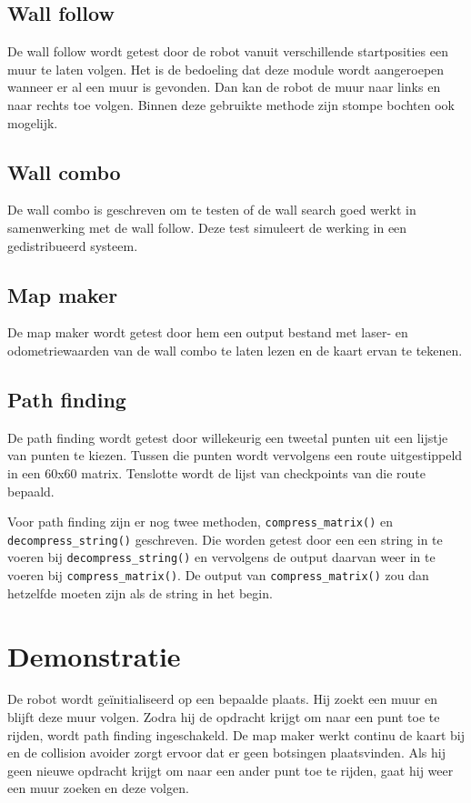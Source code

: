 \documentclass[a4paper,10pt]{article}
\begin{document}
\subsection{Wall follow}
De wall follow wordt getest door de robot vanuit verschillende startposities een muur te laten volgen. Het is de bedoeling dat deze module wordt aangeroepen wanneer er al een muur is gevonden. Dan kan de robot de muur naar links en naar rechts toe volgen. Binnen deze gebruikte methode zijn stompe bochten ook mogelijk.

\subsection{Wall combo}
De wall combo is geschreven om te testen of de wall search goed werkt in samenwerking met de wall follow. Deze test simuleert
de werking in een gedistribueerd systeem.

\subsection{Map maker}
De map maker wordt getest door hem een output bestand met laser- en odometriewaarden van de wall combo te laten lezen en de kaart ervan te tekenen.

\subsection{Path finding}
De path finding wordt getest door willekeurig een tweetal punten uit een lijstje van punten te kiezen. Tussen die punten wordt vervolgens een route uitgestippeld in een 60x60 matrix. Tenslotte wordt de lijst van checkpoints van die route bepaald.

Voor path finding zijn er nog twee methoden, \verb!compress_matrix()! en \verb!decompress_string()! geschreven. Die worden getest door een een string in te voeren bij \verb!decompress_string()! en vervolgens de output daarvan weer in te voeren bij \verb!compress_matrix()!. De output van \verb!compress_matrix()! zou dan hetzelfde moeten zijn als de string in het begin.

\section{Demonstratie}
De robot wordt ge\"{i}nitialiseerd op een bepaalde plaats. Hij zoekt een muur en blijft deze muur volgen. Zodra hij de opdracht krijgt om naar een punt toe te rijden, wordt path finding ingeschakeld. De map maker werkt continu de kaart bij en de collision avoider zorgt ervoor dat er geen botsingen plaatsvinden. Als hij geen nieuwe opdracht krijgt om naar een ander punt toe te rijden, gaat hij weer een muur zoeken en deze volgen.
\end{document}

